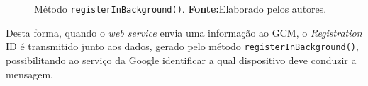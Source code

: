 	\begin{figure}[h!] 
		
		\caption[Método registerInBackground()]{Método
		\texttt{registerInBackground()}.
		\textbf{Fonte:}Elaborado pelos autores.}
		\label{fig:app22}
	\end{figure}
	
		\pagebreak
		
	\par Desta forma, quando o \textit{web service} envia uma informação ao GCM, o
\textit{Registration} ID é transmitido junto aos dados, gerado pelo método
\texttt{registerInBackground()}, possibilitando ao serviço da Google
identificar a qual dispositivo deve conduzir a mensagem.